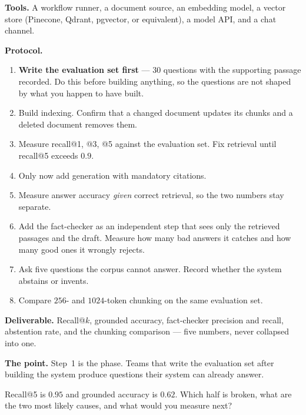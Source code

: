\begin{practicallab}
\textbf{Tools.} A workflow runner, a document source, an embedding model, a
vector store (Pinecone, Qdrant, pgvector, or equivalent), a model API, and a
chat channel.

\textbf{Protocol.}
\begin{enumerate}
  \item \textbf{Write the evaluation set first} --- $30$ questions with the
        supporting passage recorded. Do this before building anything, so the
        questions are not shaped by what you happen to have built.
  \item Build indexing. Confirm that a changed document updates its chunks and
        a deleted document removes them.
  \item Measure recall@1, @3, @5 against the evaluation set. Fix retrieval
        until recall@5 exceeds $0.9$.
  \item Only now add generation with mandatory citations.
  \item Measure answer accuracy \emph{given} correct retrieval, so the two
        numbers stay separate.
  \item Add the fact-checker as an independent step that sees only the
        retrieved passages and the draft. Measure how many bad answers it
        catches and how many good ones it wrongly rejects.
  \item Ask five questions the corpus cannot answer. Record whether the system
        abstains or invents.
  \item Compare $256$- and $1024$-token chunking on the same evaluation set.
\end{enumerate}

\textbf{Deliverable.} Recall@$k$, grounded accuracy, fact-checker precision and
recall, abstention rate, and the chunking comparison --- five numbers, never
collapsed into one.

\textbf{The point.} Step~1 is the phase. Teams that write the evaluation set
after building the system produce questions their system can already answer.
\end{practicallab}

\begin{checkpoint}
Recall@5 is $0.95$ and grounded accuracy is $0.62$. Which half is broken, what
are the two most likely causes, and what would you measure next?
\end{checkpoint}

